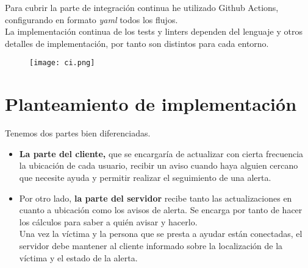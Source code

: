 Para cubrir la parte de integración continua he utilizado Github Actions,  configurando en formato \textit{yaml} todos los flujos.\\
La implementación continua de los tests y linters dependen del lenguaje y otros detalles de implementación, por tanto
son distintos para cada entorno.
\begin{figure}[H]
	\centering	
	\texttt{[image: ci.png]}
	\end{figure}

\section{Planteamiento de implementación}

Tenemos dos partes bien diferenciadas.
\begin{itemize}
	\item  \textbf{La parte del cliente,} que se encargaría de actualizar con cierta frecuencia
la ubicación de cada usuario, recibir un aviso cuando haya alguien cercano que necesite ayuda y permitir realizar el seguimiento de una alerta.
\item Por otro lado, \textbf{la parte del servidor} recibe tanto las actualizaciones en cuanto a ubicación como 
los avisos de alerta. Se encarga por tanto de hacer los cálculos para saber a quién avisar y hacerlo. \\
Una vez la víctima y la persona que se presta a ayudar están conectadas, el servidor debe mantener
al cliente informado sobre la localización de la víctima y el estado de la alerta.
\end{itemize}


